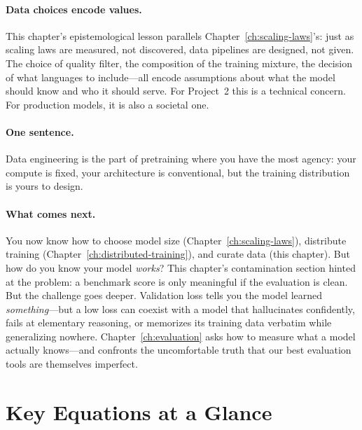 \paragraph{Data choices encode values.} This chapter's epistemological lesson parallels Chapter~\ref{ch:scaling-laws}'s: just as scaling laws are measured, not discovered, data pipelines are designed, not given. The choice of quality filter, the composition of the training mixture, the decision of what languages to include---all encode assumptions about what the model should know and who it should serve. For Project~2 this is a technical concern. For production models, it is also a societal one.

\paragraph{One sentence.} Data engineering is the part of pretraining where you have the most agency: your compute is fixed, your architecture is conventional, but the training distribution is yours to design.

\paragraph{What comes next.} You now know how to choose model size (Chapter~\ref{ch:scaling-laws}), distribute training (Chapter~\ref{ch:distributed-training}), and curate data (this chapter). But how do you know your model \emph{works}? This chapter's contamination section hinted at the problem: a benchmark score is only meaningful if the evaluation is clean. But the challenge goes deeper. Validation loss tells you the model learned \emph{something}---but a low loss can coexist with a model that hallucinates confidently, fails at elementary reasoning, or memorizes its training data verbatim while generalizing nowhere. Chapter~\ref{ch:evaluation} asks how to measure what a model actually knows---and confronts the uncomfortable truth that our best evaluation tools are themselves imperfect.


\section*{Key Equations at a Glance}

